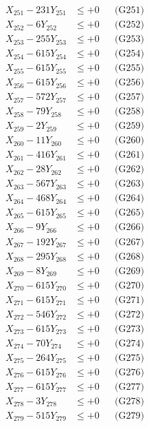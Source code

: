 \documentclass[a4paper,10pt]{article}
\begin{document}
{\begin{align}
\allowbreak
X_{251} - 231Y_{251} &\leq +0 && \text{(G251)} \\
X_{252} - 6Y_{252} &\leq +0 && \text{(G252)} \\
X_{253} - 255Y_{253} &\leq +0 && \text{(G253)} \\
X_{254} - 615Y_{254} &\leq +0 && \text{(G254)} \\
X_{255} - 615Y_{255} &\leq +0 && \text{(G255)} \\
X_{256} - 615Y_{256} &\leq +0 && \text{(G256)} \\
X_{257} - 572Y_{257} &\leq +0 && \text{(G257)} \\
X_{258} - 79Y_{258} &\leq +0 && \text{(G258)} \\
X_{259} - 2Y_{259} &\leq +0 && \text{(G259)} \\
X_{260} - 11Y_{260} &\leq +0 && \text{(G260)} \\
\allowbreak
X_{261} - 416Y_{261} &\leq +0 && \text{(G261)} \\
X_{262} - 28Y_{262} &\leq +0 && \text{(G262)} \\
X_{263} - 567Y_{263} &\leq +0 && \text{(G263)} \\
X_{264} - 468Y_{264} &\leq +0 && \text{(G264)} \\
X_{265} - 615Y_{265} &\leq +0 && \text{(G265)} \\
X_{266} - 9Y_{266} &\leq +0 && \text{(G266)} \\
X_{267} - 192Y_{267} &\leq +0 && \text{(G267)} \\
X_{268} - 295Y_{268} &\leq +0 && \text{(G268)} \\
X_{269} - 8Y_{269} &\leq +0 && \text{(G269)} \\
X_{270} - 615Y_{270} &\leq +0 && \text{(G270)} \\
\allowbreak
X_{271} - 615Y_{271} &\leq +0 && \text{(G271)} \\
X_{272} - 546Y_{272} &\leq +0 && \text{(G272)} \\
X_{273} - 615Y_{273} &\leq +0 && \text{(G273)} \\
X_{274} - 70Y_{274} &\leq +0 && \text{(G274)} \\
X_{275} - 264Y_{275} &\leq +0 && \text{(G275)} \\
X_{276} - 615Y_{276} &\leq +0 && \text{(G276)} \\
X_{277} - 615Y_{277} &\leq +0 && \text{(G277)} \\
X_{278} - 3Y_{278} &\leq +0 && \text{(G278)} \\
X_{279} - 515Y_{279} &\leq +0 && \text{(G279)} \\

\end{align}}
\end{document}
